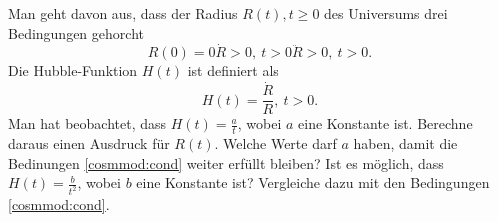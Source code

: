 \begin{Exercise}[label = cosmmod, origin = {STEP 2001, Paper 1}, title = {Hubbles  "Konstante"}, difficulty = 2]
	Man geht davon aus, dass der Radius $R\left(t\right), t\geq 0$ des Universums drei Bedingungen gehorcht
	\begin{subequations}\label{cosmmod:cond}
		\begin{equation}\label{cosmmod:bb}
			R\left(0\right) = 0
		\end{equation}
		\begin{equation}\label{cosmmod:rd}
			\dot{R} > 0, ~t>0
		\end{equation}
		\begin{equation}\label{cosmmod:rdd}
			\ddot{R} > 0 ,~t>0.
		\end{equation}
	\end{subequations}
	Die Hubble-Funktion $H\left(t\right)$ ist definiert als
	\begin{equation}
		H\left(t\right) = \frac{\dot{R}}{R},~t>0.
	\end{equation}
	\Question Man hat beobachtet, dass $H\left(t\right)= \frac{a}{t}$, wobei $a$ eine Konstante ist. Berechne daraus einen Ausdruck für $R\left(t\right)$. Welche Werte darf $a$ haben, damit die Bedinungen \eqref{cosmmod:cond} weiter erfüllt bleiben?
	\Question Ist es möglich, dass $H\left(t\right) = \frac{b}{t^2}$, wobei $b$ eine Konstante ist? Vergleiche dazu mit den Bedingungen \eqref{cosmmod:cond}.
\end{Exercise}
